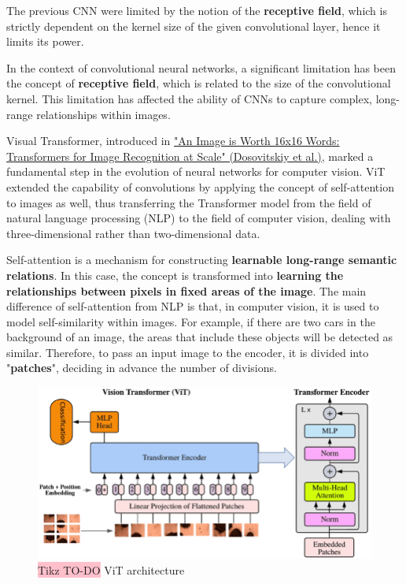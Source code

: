 The previous CNN were limited by the notion of the \textbf{receptive field}, which is strictly dependent on the kernel size of the given convolutional layer, hence it limits its power.

In the context of convolutional neural networks, a significant limitation has been the concept of \textbf{receptive field}, which is related to the size of the convolutional kernel. This limitation has affected the ability of CNNs to capture complex, long-range relationships within images.

Visual Transformer, introduced in \href{https://arxiv.org/pdf/2010.11929}{"An Image is Worth 16x16 Words: Transformers for Image Recognition at Scale" (Dosovitskiy et al.)}, marked a fundamental step in the evolution of neural networks for computer vision. ViT extended the capability of convolutions by applying the concept of self-attention to images as well, thus transferring the Transformer model from the field of natural language processing (NLP) to the field of computer vision, dealing with three-dimensional rather than two-dimensional data.

Self-attention is a mechanism for constructing \textbf{learnable long-range semantic relations}. In this case, the concept is transformed into \textbf{learning the relationships between pixels in fixed areas of the image}. The main difference of self-attention from NLP is that, in computer vision, it is used to model self-similarity within images. For example, if there are two cars in the background of an image, the areas that include these objects will be detected as similar. Therefore, to pass an input image to the encoder, it is divided into "\textbf{patches}", deciding in advance the number of divisions.

\begin{figure}[H]
    \centering
    \includegraphics[width=\linewidth]{tikz/chapter8 - Vision Transformer.png}
    \caption{{\color{red}\colorbox{pink}{Tikz TO-DO}} ViT architecture}
\end{figure}

